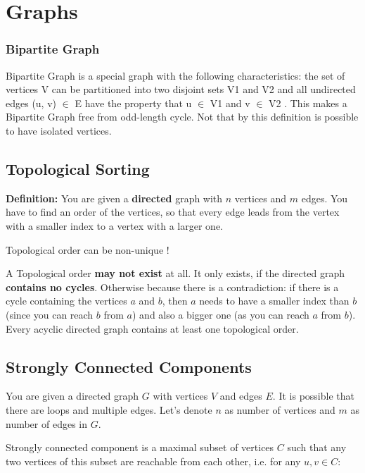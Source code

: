 \section{Graphs}


\subsubsection{Bipartite Graph}

Bipartite Graph is a special graph with the following characteristics: the set of vertices V can be partitioned into two disjoint sets V1 and V2 and all undirected edges (u, v) $\in$ E have the property that u $\in$ V1 and v $\in$ V2 . This makes a Bipartite Graph free from odd-length cycle.
Not that by this definition is possible to have isolated vertices.

\subsection{Topological Sorting}

\textbf{Definition:} You are given a \textbf{directed} graph with $n$ vertices and $m$ edges. You have to find an order of the vertices, so that every edge leads from the vertex with a smaller index to a vertex with a larger one.

Topological order can be non-unique !

A Topological order \textbf{may not exist} at all. It only exists, if the directed graph \textbf{contains no cycles}. Otherwise because there is a contradiction: if there is a cycle containing the vertices $a$ and $b$, then $a$ needs to have a smaller index than $b$ (since you can reach $b$ from $a$) and also a bigger one (as you can reach $a$ from $b$). Every acyclic directed graph contains at least one topological order.

\subsection{Strongly Connected Components}

You are given a directed graph $G$ with vertices $V$ and edges $E$. It is possible that there are loops and multiple edges. Let's denote $n$ as number of vertices and $m$ as number of edges in $G$.

Strongly connected component is a maximal subset of vertices
$C$ such that any two vertices of this subset are reachable from each other, i.e. for any $u, v \in C$:


